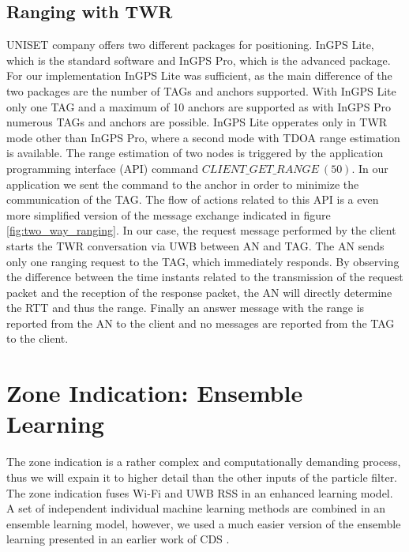 \subsection{Ranging with TWR}
UNISET company offers two different packages for positioning. InGPS Lite, which is the standard software and InGPS Pro, which is the advanced package. For our implementation InGPS Lite was sufficient, as the main difference of the two packages are the number of TAGs and anchors supported. With InGPS Lite only one TAG and a maximum of 10 anchors are supported as with InGPS Pro numerous TAGs and anchors are possible. InGPS Lite opperates only in TWR mode other than InGPS Pro, where a second mode with TDOA range estimation is available.
The range estimation of two nodes is triggered by the application programming interface (API) command $CLIENT\_GET\_RANGE\ (50)$. In our application we sent the command to the anchor in order to minimize the communication of the TAG. The flow of actions related to this API is a even more simplified version of the message exchange indicated in figure \ref{fig:two_way_ranging}. In our case, the request message performed by the client starts the TWR conversation via UWB between AN and TAG. The AN sends only one ranging request to the TAG, which immediately responds. By observing the difference between the time instants related to the transmission of the request packet and the reception of the response packet, the AN will directly determine the RTT and thus the range. Finally an answer message with the range is reported from the AN to the client and no messages are reported from the TAG to the client.



\section{Zone Indication: Ensemble Learning}
The zone indication is a rather complex and computationally demanding process, thus we will expain it to higher detail than the other inputs of the particle filter. The zone indication fuses Wi-Fi and  UWB RSS in an enhanced learning model. A set of independent individual machine learning methods are combined in an ensemble learning model, however, we used a much easier version of the ensemble learning presented in an earlier work of CDS \cite{Carrera2}.


